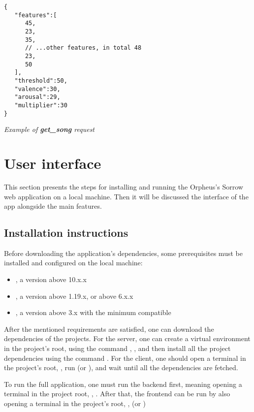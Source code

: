 \begin{listing}[H]
  \centering
  \begin{verbatim}
{
   "features":[
      45,
      23,
      35,
      // ...other features, in total 48
      23,
      50
   ],
   "threshold":50,
   "valence":30,
   "arousal":29,
   "multiplier":30
}
  \end{verbatim}
  \caption{\emph{Example of \textbf{{get\_song}} request}}
  \label{listing:dumb}
\end{listing}

\section{User interface}

This section presents the steps for installing and running the Orpheus's Sorrow
web application on a local machine.
Then it will be discussed the interface of the app alongside the main features.

\subsection{Installation instructions}

Before downloading the application's dependencies,
some prerequisites must be installed and configured on the local machine:
\begin{itemize}
  \item {}, a version above 10.x.x
  \item {}, a version above 1.19.x, or  above 6.x.x
  \item {}, a version above 3.x with the minimum compatible 
\end{itemize}

After the mentioned requirements are satisfied,
one can download the dependencies of the projects.
For the server, one can create a virtual environment in the project's root,
using the command , ,
and then install all the project dependencies using
the command .
For the client, one should open a terminal in the project's root,
, run  (or ),
and wait until all the dependencies are fetched.

To run the full application,
one must run the backend first,
meaning opening a terminal in the project root, ,
.
After that, the frontend can be run by also opening a terminal in the project's root,
,  (or )


